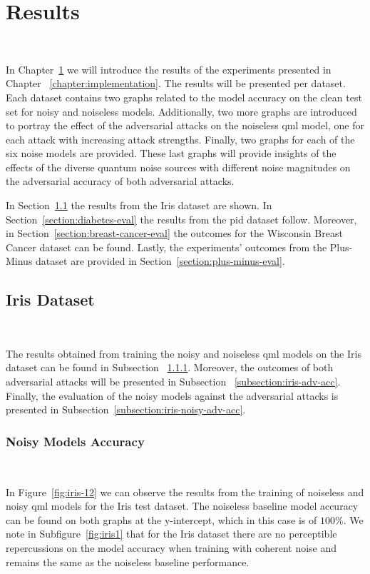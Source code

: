 \chapter{Results}\label{chapter:results} \

In Chapter~\ref{chapter:results} we will introduce
the results of the experiments presented in Chapter
~\ref{chapter:implementation}. The results will be presented
per dataset. Each dataset contains two graphs related to
the model accuracy on the clean test set for noisy and
noiseless models. Additionally, two more graphs are
introduced to portray the effect of the adversarial
attacks on the noiseless \ac{qml} model, one for each
attack with increasing attack strengths. Finally, two
graphs for each of the six noise models are provided.
These last graphs will provide insights of the effects
of the diverse quantum noise sources with different noise 
magnitudes on the adversarial accuracy of both adversarial
attacks. \

In Section~\ref{section:iris-eval} the results from
the Iris dataset are shown. In Section~\ref{section:diabetes-eval}
the results from the \ac{pid} dataset follow. Moreover,
in Section~\ref{section:breast-cancer-eval} the outcomes
for the Wisconsin Breast Cancer dataset can be found.
Lastly, the experiments' outcomes from the Plus-Minus dataset
are provided in Section~\ref{section:plus-minus-eval}. \

\section{Iris Dataset}\label{section:iris-eval} \

The results obtained from training the noisy and noiseless
\ac{qml} models on the Iris dataset can be found in Subsection
~\ref{subsection:iris-noisy-acc}. Moreover, the outcomes
of both adversarial attacks will be presented in Subsection
~\ref{subsection:iris-adv-acc}. Finally, the evaluation
of the noisy models against the adversarial attacks is
presented in Subsection~\ref{subsection:iris-noisy-adv-acc}. \

\subsection{Noisy Models Accuracy}\label{subsection:iris-noisy-acc} \

In Figure~\ref{fig:iris-12} we can observe the results
from the training of noiseless and noisy \ac{qml} models
for the Iris test dataset. The noiseless baseline model accuracy
can be found on both graphs at the y-intercept, which in
this case is of \(100\%\). We note in Subfigure~\ref{fig:iris1}
that for the Iris dataset there are no perceptible
repercussions on the model accuracy when training with
coherent noise and remains the same as the noiseless
baseline performance. \

